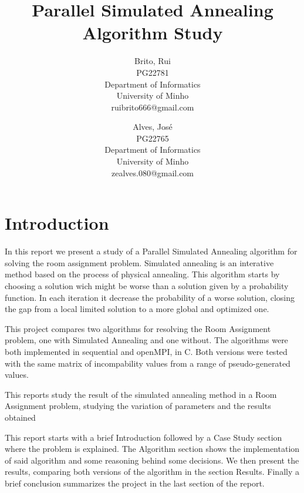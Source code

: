 \documentclass[a4paper,10pt,openright,openbib,twocolumn]{article}
\begin{document}
\begin{multicols}{2}
\title{Parallel Simulated Annealing Algorithm Study}
\author{
    Brito, Rui\\
    PG22781\\
    Department of Informatics\\
    University of Minho\\
    ruibrito666@gmail.com
  \and
    Alves, José\\
    PG22765\\
    Department of Informatics\\
    University of Minho\\
    zealves.080@gmail.com
}
\date{}
\maketitle
\end{multicols}

\begin{abstract}

\end{abstract}

\section{Introduction}
In this report we present a study of a Parallel Simulated Annealing algorithm for solving the room assignment problem. Simulated annealing is an interative method based on the process of physical annealing.
This algorithm starts by choosing a solution wich might be worse than a solution given by a probability function. In each iteration it decrease the probability of a worse solution, closing the gap from a local limited solution to a more global and optimized one.

This project compares two algorithms for resolving the Room Assignment problem, one with Simulated Annealing and one without. The algorithms were both implemented in sequential and openMPI, in C. Both versions were tested with the same matrix of incompability values from a range of pseudo-generated values.

This reports study the result of the simulated annealing method in a Room Assignment problem, studying the variation of parameters and the results obtained

This report starts with a brief Introduction followed by a Case Study section where the problem is explained. The Algorithm section shows the implementation of said algorithm and some reasoning behind some decisions. We then present the results, comparing both versions of the algorithm in the section Results. Finally a brief conclusion summarizes the project in the last section of the report.
\end{document}
